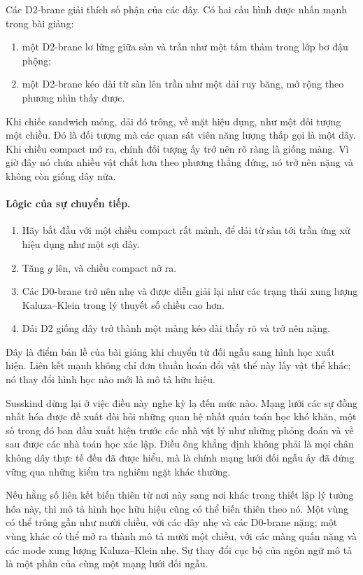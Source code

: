 Các D2-brane giải thích số phận của các dây. Có hai cấu hình được nhấn mạnh trong bài giảng:
\begin{enumerate}
\item một D2-brane lơ lửng giữa sàn và trần như một tấm thảm trong lớp bơ đậu phộng;
\item một D2-brane kéo dài từ sàn lên trần như một dải ruy băng, mở rộng theo phương nhìn thấy được.
\end{enumerate}
Khi chiếc sandwich mỏng, dải đó trông, về mặt hiệu dụng, như một đối tượng một chiều. Đó là đối tượng mà các quan sát viên năng lượng thấp gọi là một dây. Khi chiều compact mở ra, chính đối tượng ấy trở nên rõ ràng là giống màng. Vì giờ đây nó chứa nhiều vật chất hơn theo phương thẳng đứng, nó trở nên nặng và không còn giống dây nữa.

\paragraph{Lôgic của sự chuyển tiếp.}
\begin{enumerate}
\item Hãy bắt đầu với một chiều compact rất mảnh, để dải từ sàn tới trần ứng xử hiệu dụng như một sợi dây.
\item Tăng \(g\) lên, và chiều compact nở ra.
\item Các D0-brane trở nên nhẹ và được diễn giải lại như các trạng thái xung lượng Kaluza--Klein trong lý thuyết số chiều cao hơn.
\item Dải D2 giống dây trở thành một màng kéo dài thấy rõ và trở nên nặng.
\end{enumerate}
Đây là điểm bản lề của bài giảng khi chuyển từ đối ngẫu sang hình học xuất hiện. Liên kết mạnh không chỉ đơn thuần hoán đổi vật thể này lấy vật thể khác; nó thay đổi hình học nào mới là mô tả hữu hiệu.

Susskind dừng lại ở việc điều này nghe kỳ lạ đến mức nào. Mạng lưới các sự đồng nhất hóa được đề xuất đòi hỏi những quan hệ nhất quán toán học khó khăn, một số trong đó ban đầu xuất hiện trước các nhà vật lý như những phỏng đoán và về sau được các nhà toán học xác lập. Điều ông khẳng định không phải là mọi chân không dây thực tế đều đã được hiểu, mà là chính mạng lưới đối ngẫu ấy đã đứng vững qua những kiểm tra nghiêm ngặt khác thường.

Nếu hằng số liên kết biến thiên từ nơi này sang nơi khác trong thiết lập lý tưởng hóa này, thì mô tả hình học hữu hiệu cũng có thể biến thiên theo nó. Một vùng có thể trông gần như mười chiều, với các dây nhẹ và các D0-brane nặng; một vùng khác có thể mở ra thành mô tả mười một chiều, với các màng quấn nặng và các mode xung lượng Kaluza--Klein nhẹ. Sự thay đổi cục bộ của ngôn ngữ mô tả là một phần của cùng một mạng lưới đối ngẫu.

